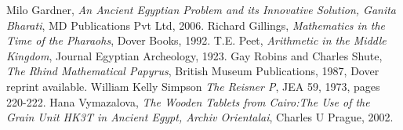\documentclass[12pt]{article}
\begin{document}
\begin{thebibliography}{6}
 Milo Gardner, \emph{An Ancient Egyptian Problem and its Innovative Solution, Ganita Bharati}, MD Publications Pvt Ltd, 2006.
Richard Gillings, \emph{Mathematics in the Time of the Pharaohs}, Dover Books, 1992.
 T.E. Peet, \emph{Arithmetic in the Middle Kingdom}, Journal Egyptian Archeology, 1923.
 Gay Robins and Charles Shute, \emph{The Rhind Mathematical Papyrus}, British Museum Publications, 1987, Dover reprint available.
 William Kelly Simpson \emph{The Reisner P}, JEA 59, 1973, pages 220-222.
 Hana Vymazalova, \emph{The Wooden Tablets from Cairo:The Use of the Grain Unit HK3T in Ancient Egypt, Archiv Orientalai}, Charles U Prague, 2002.
\end{thebibliography}


\end{document}
